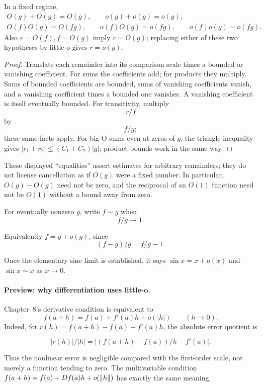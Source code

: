 \begin{proposition}
\label{prop:asymptotic-calculus}
In a fixed regime,
\[
\begin{gathered}
O(g)+O(g)=O(g),\qquad o(g)+o(g)=o(g),\\
O(f)O(g)=O(fg),\qquad o(f)O(g)=o(fg),\qquad o(f)o(g)=o(fg).
\end{gathered}
\]
Also $r=O(f), f=O(g)$ imply $r=O(g)$; replacing either of these
two hypotheses by little-o gives $r=o(g)$.
\end{proposition}
\begin{proof}
Translate each remainder into its comparison scale times a
bounded or vanishing coefficient. For sums the coefficients add; for
products they multiply. Sums of bounded coefficients are bounded, sums
of vanishing coefficients vanish, and a vanishing coefficient times a
bounded one vanishes. A vanishing coefficient is itself eventually bounded.
For transitivity, multiply
\[
r/f
\]
 by
\[
f/g;
\]
 these same facts apply.
For big-O sums even at zeros of $g$, the triangle inequality gives
$|r_1+r_2|\leq(C_1+C_2)|g|$; product bounds work in the same way.
\end{proof}
These displayed ``equalities'' assert estimates for arbitrary remainders;
they do not license cancellation as if $O(g)$ were a fixed number.
In particular, $O(g)-O(g)$ need not be zero, and the reciprocal of an
$O(1)$ function need not be $O(1)$ without a bound away from zero.

For eventually nonzero $g$, write $f\sim g$ when
\[
f/g\to1.
\]

Equivalently $f=g+o(g)$, since
\[
(f-g)/g=f/g-1.
\]

Once the elementary sine limit is established, it says
$\sin x=x+o(x)$ and $\sin x\sim x$ as $x\to0$.

\paragraph{Preview: why differentiation uses little-o.}
Chapter~8's derivative condition is equivalent to
\[
f(a+h)=f(a)+f'(a)h+o(|h|)\qquad(h\to0).
\]
Indeed, for $r(h)=f(a+h)-f(a)-f'(a)h$, the absolute error quotient is

\[
|r(h)|/|h|=|(f(a+h)-f(a))/h-f'(a)|.
\]

Thus the nonlinear error is negligible compared with the first-order
scale, not merely a function tending to zero. The multivariable condition
$f(a+h)=f(a)+Df(a)h+o(\lVert h\rVert)$ has exactly the same meaning.

